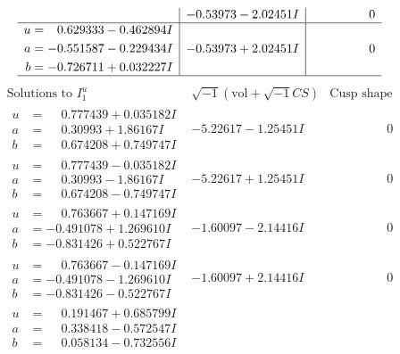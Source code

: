 \documentclass[1p]{elsarticle_modified}
\theoremstyle{definition}
\newcommand{\I}{\sqrt{-1}}
\begin{document}
$$\begin{array}{c|c|c}
 & -0.53973 - 2.02451 I & \phantom{-0.000000 } 0 \\ \hline\begin{aligned}
u &= \phantom{-}0.629333 - 0.462894 I \\
a &= -0.551587 - 0.229434 I \\
b &= -0.726711 + 0.032227 I\end{aligned}
 & -0.53973 + 2.02451 I & \phantom{-0.000000 } 0\\
 \hline 
 \end{array}$$\newpage$$\begin{array}{c|c|c}  
\text{Solutions to }I^u_{1}& \I (\text{vol} + \sqrt{-1}CS) & \text{Cusp shape}\\
 \hline 
\begin{aligned}
u &= \phantom{-}0.777439 + 0.035182 I \\
a &= \phantom{-}0.30993 + 1.86167 I \\
b &= \phantom{-}0.674208 + 0.749747 I\end{aligned}
 & -5.22617 - 1.25451 I & \phantom{-0.000000 } 0 \\ \hline\begin{aligned}
u &= \phantom{-}0.777439 - 0.035182 I \\
a &= \phantom{-}0.30993 - 1.86167 I \\
b &= \phantom{-}0.674208 - 0.749747 I\end{aligned}
 & -5.22617 + 1.25451 I & \phantom{-0.000000 } 0 \\ \hline\begin{aligned}
u &= \phantom{-}0.763667 + 0.147169 I \\
a &= -0.491078 + 1.269610 I \\
b &= -0.831426 + 0.522767 I\end{aligned}
 & -1.60097 - 2.14416 I & \phantom{-0.000000 } 0 \\ \hline\begin{aligned}
u &= \phantom{-}0.763667 - 0.147169 I \\
a &= -0.491078 - 1.269610 I \\
b &= -0.831426 - 0.522767 I\end{aligned}
 & -1.60097 + 2.14416 I & \phantom{-0.000000 } 0 \\ \hline\begin{aligned}
u &= \phantom{-}0.191467 + 0.685799 I \\
a &= \phantom{-}0.338418 - 0.572547 I \\
b &= \phantom{-}0.058134 - 0.732556 I\end{aligned}

\end{array}$$
\end{document}
